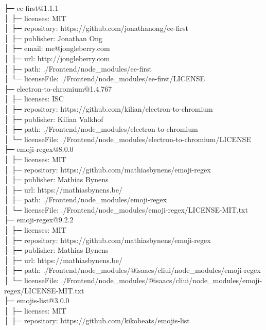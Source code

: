 ├─ ee-first@1.1.1\\
│  ├─ licenses: MIT\\
│  ├─ repository: https://github.com/jonathanong/ee-first\\
│  ├─ publisher: Jonathan Ong\\
│  ├─ email: me@jongleberry.com\\
│  ├─ url: http://jongleberry.com\\
│  ├─ path: ./Frontend/node\_modules/ee-first\\
│  └─ licenseFile: ./Frontend/node\_modules/ee-first/LICENSE\\
├─ electron-to-chromium@1.4.767\\
│  ├─ licenses: ISC\\
│  ├─ repository: https://github.com/kilian/electron-to-chromium\\
│  ├─ publisher: Kilian Valkhof\\
│  ├─ path: ./Frontend/node\_modules/electron-to-chromium\\
│  └─ licenseFile: ./Frontend/node\_modules/electron-to-chromium/LICENSE\\
├─ emoji-regex@8.0.0\\
│  ├─ licenses: MIT\\
│  ├─ repository: https://github.com/mathiasbynens/emoji-regex\\
│  ├─ publisher: Mathias Bynens\\
│  ├─ url: https://mathiasbynens.be/\\
│  ├─ path: ./Frontend/node\_modules/emoji-regex\\
│  └─ licenseFile: ./Frontend/node\_modules/emoji-regex/LICENSE-MIT.txt\\
├─ emoji-regex@9.2.2\\
│  ├─ licenses: MIT\\
│  ├─ repository: https://github.com/mathiasbynens/emoji-regex\\
│  ├─ publisher: Mathias Bynens\\
│  ├─ url: https://mathiasbynens.be/\\
│  ├─ path: ./Frontend/node\_modules/@isaacs/cliui/node\_modules/emoji-regex\\
│  └─ licenseFile: ./Frontend/node\_modules/@isaacs/cliui/node\_modules/emoji-regex/LICENSE-MIT.txt\\
├─ emojis-list@3.0.0\\
│  ├─ licenses: MIT\\
│  ├─ repository: https://github.com/kikobeats/emojis-list\\
